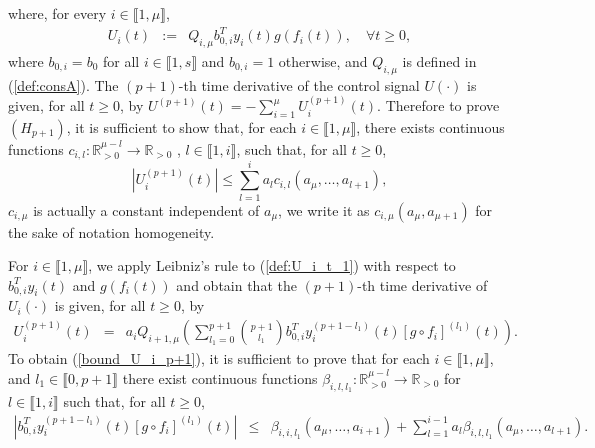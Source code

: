 \documentclass[letterpaper, 10pt]{article}
\newcommand{\rref}[1]{(\ref{#1})}
\newcommand{\abs}[1]{\left| #1 \right|}
\newcommand{\reels}{\mathbb{R}}
\begin{document}
where, for every $i \in \llbracket 1 , \mu \rrbracket $,
\begin{eqnarray}
\label{def:U_i_t_1}
U_i(t) & := & Q_{i,\mu} b_{0,i}^T y_i(t) g(f_i(t)), \quad \forall t \geq 0, \label{def:U_i_t_2}
\end{eqnarray} 
where $b_{0,i} = b_0$ for all $i \in \llbracket 1 , s \rrbracket$ and $b_{0,i}=1$ otherwise, and $Q_{i, \mu}$ is defined in \rref{def:consA}. The $(p+1)$-th time derivative of the control signal $U(\cdot)$ is given, for all $t \geq 0$, by $U^{(p+1)}(t)  =  -  \sum_{i=1}^{\mu} U_i^{(p+1)}(t)$. Therefore to prove $(H_{p+1})$, it is sufficient to show that, for each $i \in \llbracket 1 , \mu \rrbracket$, there exists continuous functions $c_{i,l} : \reels^{\mu -l}_{>0 } \to \reels_{>0} $ , $l \in \llbracket 1 , i \rrbracket$, such that, for all $t \geq 0$,
\begin{equation}
\label{bound_U_i_p+1}
\abs{U_i^{(p+1)}(t) } \leq  \sum\limits_{l=1 }^{i} a_l c_{i,l}(a_\mu , \ldots , a_{l+1}),
\end{equation}
$c_{i,\mu}$ is actually a constant independent of $a_\mu$, we write it as $c_{i , \mu} (a_{\mu},a_{\mu+1}) $ for the sake of notation homogeneity.


For $i \in \llbracket 1 , \mu \rrbracket $, we apply Leibniz's rule to \rref{def:U_i_t_1} with respect to $b_{0,i}^T y_i(t) $ and $g(f_i(t))$ and obtain that the $(p+1)$-th time derivative of $U_i(\cdot)$ is given, for all $t \geq 0$, by 
\begin{eqnarray*}
U_i^{(p+1)}(t) & = & a_i Q_{i+1,\mu} \left( \sum\limits_{l_1 = 0}^{p+1 } \binom{p+1}{l_1} b_{0,i}^T y_i^{(p+1-l_1)}(t) [g \circ f_i]^{(l_1)}(t) \right).
\end{eqnarray*} To obtain \rref{bound_U_i_p+1}, it is sufficient to prove that for each $i \in \llbracket 1 , \mu \rrbracket$, and $l_1 \in \llbracket 0, p+1 \rrbracket$ there exist continuous functions $ \beta_{i,l, l_1}  : \reels^{\mu -l}_{>0 } \to \reels_{>0}$ for $l \in \llbracket 1, i \rrbracket $ such that, for all $t \geq 0$,
\begin{eqnarray}
\label{est:int1}
\abs{b_{0,i}^T y_i^{(p+1-l_1)}(t) [g \circ f_i]^{(l_1)}(t)  }  & \leq & \beta_{i,i,l_1}(a_\mu ,\ldots , a_{i+1}) + \sum\limits_{l=1 }^{i-1} a_l \beta_{i,l,l_1}(a_\mu ,\ldots , a_{l+1}).
\end{eqnarray}
\end{document}
